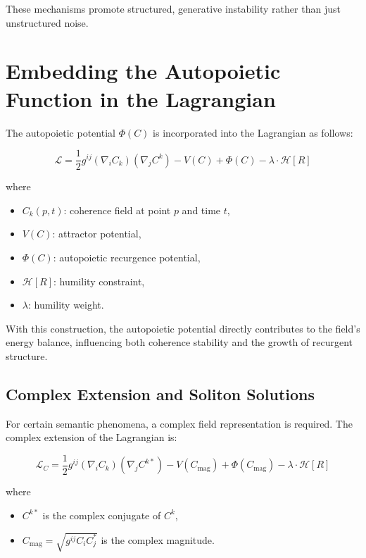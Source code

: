 These mechanisms promote structured, generative instability rather than just unstructured noise.

\section{Embedding the Autopoietic Function in the Lagrangian}

The autopoietic potential \(\Phi(C)\) is incorporated into the Lagrangian as follows:

\begin{equation}
\mathcal{L} = \frac{1}{2} g^{ij} (\nabla_i C_k)(\nabla_j C^k) - V(C) + \Phi(C) - \lambda \cdot \mathcal{H}[R]
\end{equation}

where 
\begin{itemize}
    \item \(C_k(p,t)\): coherence field at point \(p\) and time \(t\),
    \item \(V(C)\): attractor potential,
    \item \(\Phi(C)\): autopoietic recurgence potential,
    \item \(\mathcal{H}[R]\): humility constraint,
    \item \(\lambda\): humility weight.
\end{itemize}

With this construction, the autopoietic potential directly contributes to the field's energy balance, influencing both coherence stability and the growth of recurgent structure.

\subsection{Complex Extension and Soliton Solutions}

For certain semantic phenomena, a complex field representation is required. The complex extension of the Lagrangian is:

\begin{equation}
\mathcal{L}_C = \frac{1}{2} g^{ij} (\nabla_i C_k)(\nabla_j C^{k*}) - V(C_{\mathrm{mag}}) + \Phi(C_{\mathrm{mag}}) - \lambda \cdot \mathcal{H}[R]
\end{equation}

where

\begin{itemize}
    \item \(C^{k*}\) is the complex conjugate of \(C^k\),
    \item \(C_{\mathrm{mag}} = \sqrt{g^{ij}C_i C_j^*}\) is the complex magnitude.
\end{itemize}

